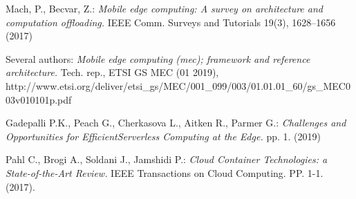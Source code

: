 \begin{thebibliography}{9}
        Mach, P., Becvar, Z.:
        \textit{Mobile edge computing: A survey on architecture and computation offloading.}
        IEEE Comm. Surveys and Tutorials 19(3), 1628–1656 (2017)

        Several authors:
        \textit{Mobile edge computing (mec); framework and reference architecture.}
        Tech. rep., ETSI GS MEC (01 2019), \\
        http://www.etsi.org/deliver/etsi\_gs/MEC/001\_099/003/01.01.01\_60/gs\_MEC003v010101p.pdf

        Gadepalli P.K., Peach G., Cherkasova L., Aitken R., Parmer G.:
        \textit{Challenges and Opportunities for EfficientServerless Computing at the Edge.}
        pp. 1. (2019)

        Pahl C., Brogi A., Soldani J., Jamshidi P.:
        \textit{Cloud Container Technologies: a State-of-the-Art Review.}
        IEEE Transactions on Cloud Computing. PP. 1-1. (2017). 

\end{thebibliography}